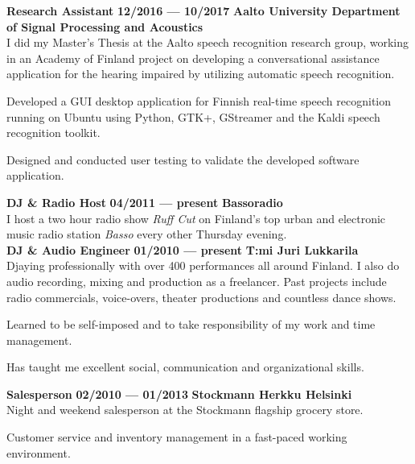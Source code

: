 \documentclass[8pt,a4paper,oneside]{article}
\newcommand{\myrule}{\vspace{0.5mm} {\color{lightgray}{\hrule height 0.5pt width \textwidth depth 0pt}} \vspace{1mm}}
\newcommand{\titledate}[2]{{\bfseries \color{textcolor}  \fontsize{11.5}{11.5}\selectfont #1} \hfill \textbf{#2} \myrule}
\newcommand{\workplace}[1]{{\bfseries \fontsize{10.5}{10.5}\selectfont #1}}
\newcommand{\sectitle}[1]{{\sc \bfseries \LARGE #1}}
\newcommand{\boxarc}{2.5mm}
\newcommand{\boxtop}{1.5mm}
\begin{document}
\begin{minipage}[t]{0.638\textwidth}
\begin{tcolorbox}[top=1mm,bottom=1mm,right=1mm,left=1mm,arc=\boxarc,toptitle=\boxtop,bottomtitle=1mm,title=\sectitle{Experience},box align=bottom]
		\titledate{Research Assistant}{12/2016 --- 10/2017}
		\workplace{Aalto University Department of Signal Processing and Acoustics} \\
		I did my Master’s Thesis at the Aalto speech recognition research group, working in an Academy of Finland project on developing a conversational assistance application for the hearing impaired by utilizing automatic speech recognition.
		\begin{cvlist}
			\item Developed a GUI desktop application for Finnish real-time speech recognition running on Ubuntu using Python, GTK+, GStreamer and the Kaldi speech recognition toolkit.
			\item Designed and conducted user testing to validate the developed software application. \\
		\end{cvlist}
		
		\titledate{DJ \& Radio Host}{04/2011 --- present}
		\workplace{Bassoradio} \\
		I host a two hour radio show \textit{Ruff Cut} on Finland’s top urban and electronic music radio station \textit{Basso} every other Thursday evening. \\
		
		\titledate{DJ \& Audio Engineer}{01/2010 --- present}
		\workplace{T:mi Juri Lukkarila} \\
		Djaying professionally with over 400 performances all around Finland. I also do audio recording, mixing and production as a freelancer. Past projects include radio commercials, voice-overs, theater productions and countless dance shows.
		\begin{cvlist}
			\item Learned to be self-imposed and to take responsibility of my work and time management.
			\item Has taught me excellent social, communication and organizational skills. \\
		\end{cvlist}
		
		\titledate{Salesperson }{02/2010 --- 01/2013}
		\workplace{Stockmann Herkku Helsinki} \\
		Night and weekend salesperson at the Stockmann flagship grocery store.
		\begin{cvlist}
			\item Customer service and inventory management in a fast-paced working environment.
		\end{cvlist}
	\end{tcolorbox}
	
\end{minipage}%
\end{document}
